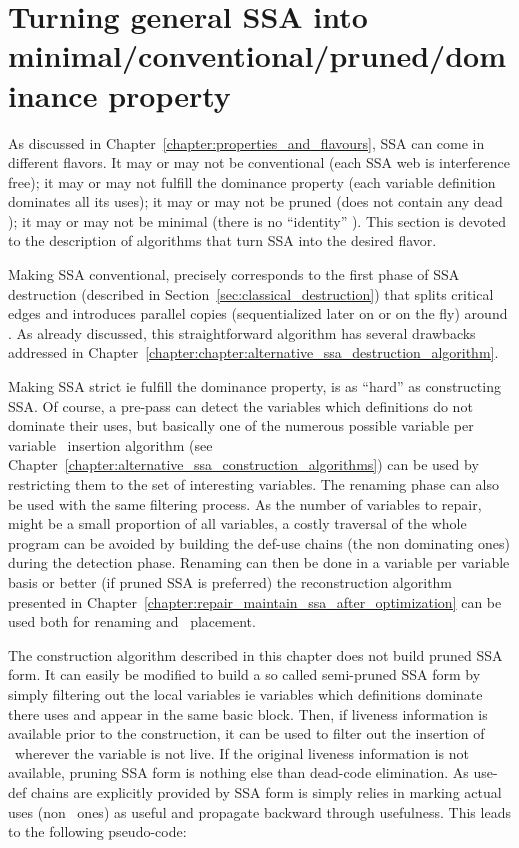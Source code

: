 \section{Turning general SSA into minimal/conventional/pruned/dominance property}

As discussed in Chapter~\ref{chapter:properties_and_flavours}, SSA can come in different flavors. It may or may not be conventional (each SSA web is interference free); it may or may not fulfill the dominance property (each variable definition dominates all its uses); it may or may not be pruned (does not contain any dead \phiop); it may or may not be minimal (there is no ``identity'' \phiops).
This section is devoted to the description of algorithms that turn SSA into the desired flavor.

Making SSA conventional, precisely corresponds to the first phase of SSA destruction (described in Section~\ref{sec:classical_destruction}) that splits critical edges and introduces parallel copies (sequentialized later on or on the fly) around \phiops. As already discussed, this straightforward algorithm has several drawbacks addressed in Chapter~\ref{chapter:chapter:alternative_ssa_destruction_algorithm}.

Making SSA strict ie fulfill the dominance property, is as ``hard'' as constructing SSA. Of course, a pre-pass can detect the variables which definitions do not dominate their uses, but basically one of the numerous possible variable per variable \phiops\ insertion algorithm (see Chapter~\ref{chapter:alternative_ssa_construction_algorithms}) can be used by restricting them to the set of interesting variables. The renaming phase can also be used with the same filtering process. As the number of variables to repair, might be a small proportion of all variables, a costly traversal of the whole program can be avoided by building the def-use chains (the non dominating ones) during the detection phase. Renaming can then be done in a variable per variable basis or better (if pruned SSA is preferred) the reconstruction algorithm presented in Chapter~\ref{chapter:repair_maintain_ssa_after_optimization} can be used both for renaming and \phiops\ placement.

The construction algorithm described in this chapter does not build pruned SSA form. It can easily be modified to build a so called semi-pruned SSA form by simply filtering out the local variables ie variables which definitions dominate there uses and appear in the same basic block. Then, if liveness information is available prior to the construction, it can be used to filter out the insertion of \phiops\ wherever the variable is not live.
If the original liveness information is not available, pruning SSA form is nothing else than dead-code elimination. As use-def chains are explicitly provided by SSA form is simply relies in marking actual uses (non \phiops\ ones) as useful and propagate backward through \phiops usefulness. This leads to the following pseudo-code:

